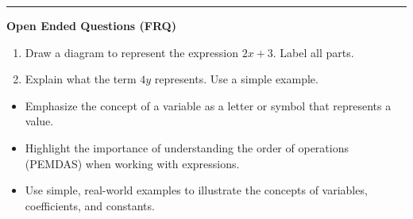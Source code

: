 \documentclass[10pt]{article}
\begin{document}
\vspace{-0.2cm}
\hrule
\vspace{0.2cm}
\textbf{\small Open Ended Questions (FRQ)}
\begin{enumerate}[label=\textbf{Q\arabic*.}, start=9, itemsep=5pt, topsep=0pt]

  \item \small Draw a diagram to represent the expression $2x + 3$. Label all parts. \vspace{2cm}

  \item \small Explain what the term $4y$ represents. Use a simple example. \vspace{2cm}

\end{enumerate}

\vfill

\begin{tcolorbox}[colback=blue!5, colframe=mainblue!50, title=\small \textbf{Chef's Tips}, fonttitle=\bfseries, bottom=1mm]
\begin{itemize}[noitemsep, topsep=2pt, leftmargin=0.5cm]
  \item \scriptsize Emphasize the concept of a variable as a letter or symbol that represents a value.\item \scriptsize Highlight the importance of understanding the order of operations (PEMDAS) when working with expressions.\item \scriptsize Use simple, real-world examples to illustrate the concepts of variables, coefficients, and constants.
\end{itemize}
\end{tcolorbox}
\end{document}
